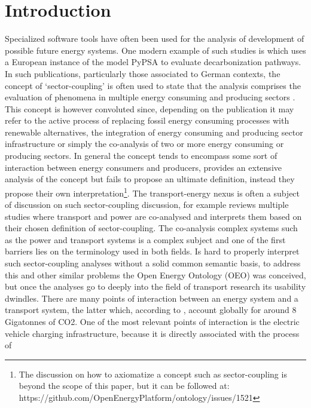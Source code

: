 ﻿\section{Introduction}

Specialized software tools have often been used for the analysis of development
of possible future energy systems. One modern example of such studies is
\cite{Victoria.2022} which uses a European instance of the model PyPSA
\cite{Brown.2018} to evaluate decarbonization pathways. In such publications,
particularly those associated to German contexts, the concept of
`sector-coupling' is often used to state that the analysis comprises the
evaluation of phenomena in multiple energy consuming and producing sectors
\cite{Fridgen.2020}. This concept is however convoluted since, depending on the
publication it may refer to the active process of replacing fossil energy
consuming processes with renewable alternatives, the integration of energy
consuming and producing sector infrastructure or simply the co-analysis of two
or more energy consuming or producing sectors. In general the concept tends to
encompass some sort of interaction between energy consumers and producers,
\cite{Ramsebner.2021} provides an extensive analysis of the concept but fails
to propose an ultimate definition, instead they propose their own
interpretation\footnote{The discussion on how to axiomatize a concept such as
sector-coupling is beyond the scope of this paper, but it can be followed at:
https://github.com/OpenEnergyPlatform/ontology/issues/1521}. The
transport-energy nexus is often a subject of discussion on such sector-coupling
discussion, for example \cite{Robinius.2017} reviews multiple studies where
transport and power are co-analysed and interprets them based on their chosen
definition of sector-coupling. The co-analysis complex systems such as the
power and transport systems is a complex subject and one of the first barriers
lies on the terminology used in both fields. Is hard to properly interpret such
sector-coupling analyses without a solid common semantic basis, to address this
and other similar problems the Open Energy Ontology (OEO) \cite{Booshehri.2021}
was conceived, but once the analyses go to deeply into the field of transport
research its usability dwindles. There are many points of interaction between
an energy system and a transport system, the latter which, according to
\cite{IEA.2023}, account globally for around 8 Gigatonnes of CO2. One of the
most relevant points of interaction is the electric vehicle charging
infrastructure, because it is directly associated with the process of

